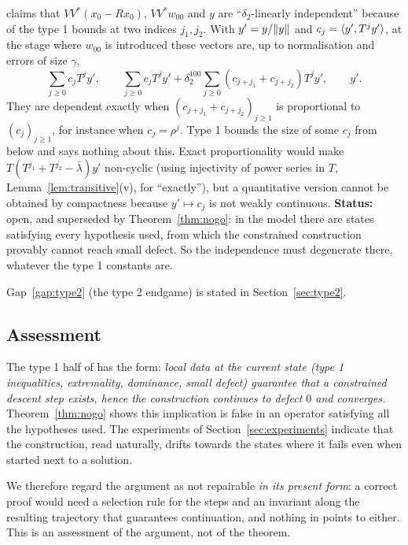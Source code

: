 \begin{gap}\label{gap:indep}
\paper{} claims that $VV^*(x_0-Rx_0)$, $VV^*w_{00}$ and $y$ are ``$\delta_2$-linearly
independent'' because of the type 1 bounds at two indices $j_1,j_2$. With $y'=y/\lVert y\rVert$ and
$c_j=\langle y',T^jy'\rangle$, at the stage where $w_{00}$ is introduced these vectors are, up to
normalisation and errors of size $\gamma$,
\[
\sum_{j\ge0}c_jT^jy',\qquad
\sum_{j\ge0}c_jT^jy'+\delta_2^{100}\sum_{j\ge0}(c_{j+j_1}+c_{j+j_2})T^jy',\qquad y' .
\]
They are dependent exactly when $(c_{j+j_1}+c_{j+j_2})_{j\ge1}$ is proportional to
$(c_j)_{j\ge1}$, for instance when $c_j=\rho^j$. Type 1 bounds the size of some $c_j$ from below
and says nothing about this. Exact proportionality would make
$T(T^{j_1}+T^{j_2}-\bar\lambda)y'$ non-cyclic (using injectivity of power series in $T$,
Lemma~\ref{lem:transitive}(v), for ``exactly''), but a quantitative version cannot be obtained by
compactness because $y'\mapsto c_j$ is not weakly continuous. \textbf{Status:} open, and
superseded by Theorem~\ref{thm:nogo}: in the model there are states satisfying every hypothesis
used, from which the constrained construction provably cannot reach small defect. So the
independence must degenerate there, whatever the type 1 constants are.
\end{gap}

Gap~\ref{gap:type2} (the type 2 endgame) is stated in Section~\ref{sec:type2}.

\subsection{Assessment}
The type 1 half of \paper{} has the form: \emph{local data at the current state (type 1
inequalities, extremality, dominance, small defect) guarantee that a constrained descent step
exists, hence the construction continues to defect $0$ and converges.} Theorem~\ref{thm:nogo}
shows this implication is false in an operator satisfying all the hypotheses used. The
experiments of Section~\ref{sec:experiments} indicate that the construction, read naturally,
drifts towards the states where it fails even when started next to a solution.

We therefore regard the argument as not repairable \emph{in its present form}: a correct proof
would need a selection rule for the steps and an invariant along the resulting trajectory that
guarantees continuation, and nothing in \paper{} points to either. This is an assessment of the
argument, not of the theorem.

